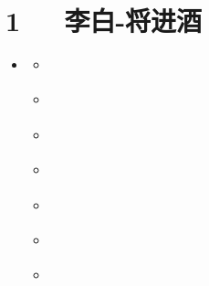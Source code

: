 \documentclass[letterpaper,12pt,english]{sphinxmanual}
\begin{document}
\chapter{1   李白-将进酒}
\label{\detokenize{p01_u6563_u6587/_u674e_u767d-_u5c06_u8fdb_u9152:id1}}\label{\detokenize{p01_u6563_u6587/_u674e_u767d-_u5c06_u8fdb_u9152::doc}}
\begin{sphinxShadowBox}
\begin{itemize}
\item {} 
\label{\detokenize{p01_u6563_u6587/_u674e_u767d-_u5c06_u8fdb_u9152:id10}}{\hyperref[\detokenize{p01_u6563_u6587/_u674e_u767d-_u5c06_u8fdb_u9152:id1}]{}}
\begin{itemize}
\item {} 
\label{\detokenize{p01_u6563_u6587/_u674e_u767d-_u5c06_u8fdb_u9152:id11}}{\hyperref[\detokenize{p01_u6563_u6587/_u674e_u767d-_u5c06_u8fdb_u9152:id3}]{}}

\item {} 
\label{\detokenize{p01_u6563_u6587/_u674e_u767d-_u5c06_u8fdb_u9152:id12}}{\hyperref[\detokenize{p01_u6563_u6587/_u674e_u767d-_u5c06_u8fdb_u9152:id4}]{}}

\item {} 
\label{\detokenize{p01_u6563_u6587/_u674e_u767d-_u5c06_u8fdb_u9152:id13}}{\hyperref[\detokenize{p01_u6563_u6587/_u674e_u767d-_u5c06_u8fdb_u9152:id5}]{}}

\item {} 
\label{\detokenize{p01_u6563_u6587/_u674e_u767d-_u5c06_u8fdb_u9152:id14}}{\hyperref[\detokenize{p01_u6563_u6587/_u674e_u767d-_u5c06_u8fdb_u9152:id6}]{}}

\item {} 
\label{\detokenize{p01_u6563_u6587/_u674e_u767d-_u5c06_u8fdb_u9152:id15}}{\hyperref[\detokenize{p01_u6563_u6587/_u674e_u767d-_u5c06_u8fdb_u9152:id7}]{}}

\item {} 
\label{\detokenize{p01_u6563_u6587/_u674e_u767d-_u5c06_u8fdb_u9152:id16}}{\hyperref[\detokenize{p01_u6563_u6587/_u674e_u767d-_u5c06_u8fdb_u9152:id8}]{}}

\item {} 
\label{\detokenize{p01_u6563_u6587/_u674e_u767d-_u5c06_u8fdb_u9152:id17}}{\hyperref[\detokenize{p01_u6563_u6587/_u674e_u767d-_u5c06_u8fdb_u9152:id9}]{}}

\end{itemize}

\end{itemize}
\end{sphinxShadowBox}
\end{document}
